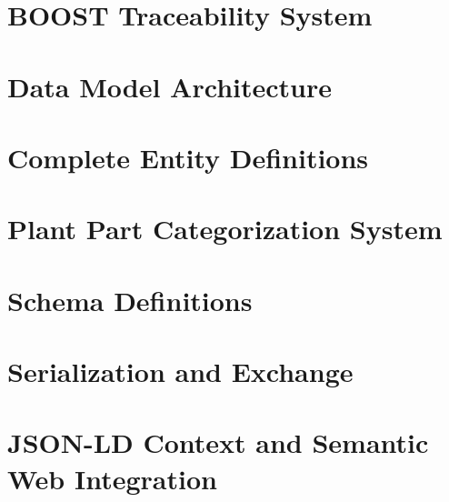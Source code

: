 \documentclass{article}
\begin{document}
\section{BOOST Traceability System}
\label{sec:traceability-system}


\section{Data Model Architecture}
\label{sec:data-model}


\section{Complete Entity Definitions}
\label{sec:complete-entities}









\section{Plant Part Categorization System}
\label{sec:plant-parts}



\section{Schema Definitions}
\label{sec:schema-definitions}


\section{Serialization and Exchange}
\label{sec:serialization}


\section{JSON-LD Context and Semantic Web Integration}
\label{sec:jsonld-context}

\end{document}
